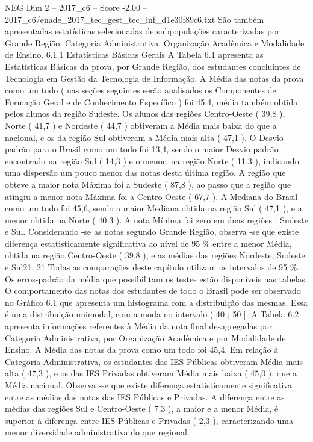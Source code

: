 \begin{textsample}{NEG Dim 2 – 2017\_c6 – Score -2.00 – 2017\_c6/enade\_2017\_tec\_gest\_tec\_inf\_d1e30f89c6.txt}
São também apresentadas estatísticas selecionadas de subpopulações caracterizadas por Grande Região, Categoria Administrativa, Organização Acadêmica e Modalidade de Ensino. 6.1.1 Estatísticas Básicas Gerais A Tabela 6.1 apresenta as Estatísticas Básicas da prova, por Grande Região, dos estudantes concluintes de Tecnologia em Gestão da Tecnologia de Informação.
A Média das notas da prova como um todo ( nas seções seguintes serão analisados os Componentes de Formação Geral e de Conhecimento Específico ) foi 45,4, média também obtida pelos alunos da região Sudeste.
Os alunos das regiões Centro-Oeste ( 39,8 ), Norte ( 41,7 ) e Nordeste ( 44,7 ) obtiveram a Média mais baixa do que a nacional, e os da região Sul obtiveram a Média mais alta ( 47,1 ).
O Desvio padrão para o Brasil como um todo foi 13,4, sendo o maior Desvio padrão encontrado na região Sul ( 14,3 ) e o menor, na região Norte ( 11,3 ), indicando uma dispersão um pouco menor das notas desta última região.
A região que obteve a maior nota Máxima foi a Sudeste ( 87,8 ), ao passo que a região que atingiu a menor nota Máxima foi a Centro-Oeste ( 67,7 ).
A Mediana do Brasil como um todo foi 45,6, sendo a maior Mediana obtida na região Sul ( 47,1 ), e a menor obtida na Norte ( 40,3 ).
A nota Mínima foi zero em duas regiões : Sudeste e Sul.
Considerando -se as notas segundo Grande Região, observa -se que existe diferença estatisticamente significativa ao nível de 95 \% entre a menor Média, obtida na região Centro-Oeste ( 39,8 ), e as médias das regiões Nordeste, Sudeste e Sul21. 21 Todas as comparações deste capítulo utilizam os intervalos de 95 \%.
Os erros-padrão da média que possibilitam os testes estão disponíveis nas tabelas.
O comportamento das notas dos estudantes de todo o Brasil pode ser observado no Gráfico 6.1 que apresenta um histograma com a distribuição das mesmas.
Essa é uma distribuição unimodal, com a moda no intervalo ( 40 ; 50 ].
A Tabela 6.2 apresenta informações referentes à Média da nota final desagregadas por Categoria Administrativa, por Organização Acadêmica e por Modalidade de Ensino.
A Média das notas da prova como um todo foi 45,4.
Em relação à Categoria Administrativa, os estudantes das IES Públicas obtiveram Média mais alta ( 47,3 ), e os das IES Privadas obtiveram Média mais baixa ( 45,0 ), que a Média nacional.
Observa -se que existe diferença estatisticamente significativa entre as médias das notas das IES Públicas e Privadas.
A diferença entre as médias das regiões Sul e Centro-Oeste ( 7,3 ), a maior e a menor Média, é superior à diferença entre IES Públicas e Privadas ( 2,3 ), caracterizando uma menor diversidade administrativa do que regional.

\end{textsample}
